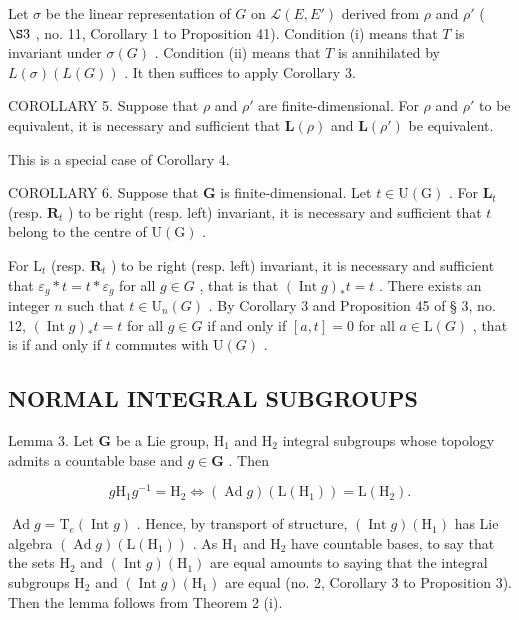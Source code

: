 Let \(\sigma\) be the linear representation of \(G\) on \(\mathcal{L}(E, E')\) derived from \(\rho\) and \(\rho'\) ( \(\S 3\) , no. 11, Corollary 1 to Proposition 41). Condition (i) means that \(T\) is invariant under \(\sigma(G)\) . Condition (ii) means that \(T\) is annihilated by \(L(\sigma)(L(G))\) . It then suffices to apply Corollary 3.

COROLLARY 5. Suppose that \(\rho\) and \(\rho'\) are finite-dimensional. For \(\rho\) and \(\rho'\) to be equivalent, it is necessary and sufficient that \(\mathbf{L}(\rho)\) and \(\mathbf{L}(\rho')\) be equivalent.

This is a special case of Corollary 4.

COROLLARY 6. Suppose that \(\mathbf{G}\) is finite-dimensional. Let \(t \in \mathrm{U}(\mathrm{G})\) . For \(\mathbf{L}_t\) (resp. \(\mathbf{R}_t\) ) to be right (resp. left) invariant, it is necessary and sufficient that \(t\) belong to the centre of \(\mathrm{U}(\mathrm{G})\) .

For \(\mathrm{L}_t\) (resp. \(\mathbf{R}_t\) ) to be right (resp. left) invariant, it is necessary and sufficient that \(\varepsilon_g * t = t * \varepsilon_g\) for all \(g \in G\) , that is that \((\operatorname{Int} g)_* t = t\) . There exists an integer \(n\) such that \(t \in \mathrm{U}_n(G)\) . By Corollary 3 and Proposition 45 of § 3, no. 12, \((\operatorname{Int} g)_* t = t\) for all \(g \in G\) if and only if \([a, t] = 0\) for all \(a \in \mathrm{L}(G)\) , that is if and only if \(t\) commutes with \(\mathrm{U}(G)\) .

\subsection{NORMAL INTEGRAL SUBGROUPS}

Lemma 3. Let \(\mathbf{G}\) be a Lie group, \(\mathrm{H}_1\) and \(\mathrm{H}_2\) integral subgroups whose topology admits a countable base and \(g \in \mathbf{G}\) . Then

\[
g \mathrm{H} _ {1} g ^ {- 1} = \mathrm{H} _ {2} \Leftrightarrow (\operatorname{Ad} g) (\mathrm{L} (\mathrm{H} _ {1})) = \mathrm{L} (\mathrm{H} _ {2}).
\]

\(\operatorname{Ad} g = \mathrm{T}_{e}(\operatorname{Int} g)\) . Hence, by transport of structure, \((\operatorname{Int} g)(\mathrm{H}_{1})\) has Lie algebra \((\operatorname{Ad} g)(\mathrm{L}(\mathrm{H}_{1}))\) . As \(\mathrm{H}_{1}\) and \(\mathrm{H}_{2}\) have countable bases, to say that the sets \(\mathrm{H}_{2}\) and \((\operatorname{Int} g)(\mathrm{H}_{1})\) are equal amounts to saying that the integral subgroups \(\mathrm{H}_{2}\) and \((\operatorname{Int} g)(\mathrm{H}_{1})\) are equal (no. 2, Corollary 3 to Proposition 3). Then the lemma follows from Theorem 2 (i).

